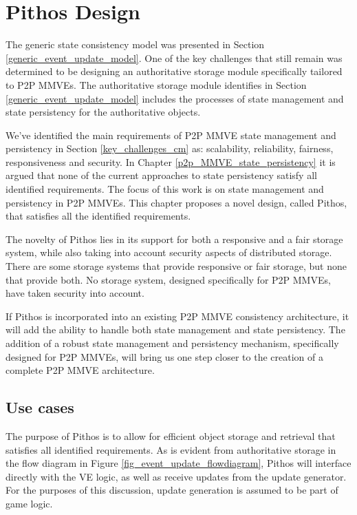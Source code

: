 \chapter{Pithos Design}
\label{chp:DESIGN}

The generic state consistency model was presented in Section \ref{generic_event_update_model}. One of the key challenges that still remain was determined to be designing an authoritative storage module specifically tailored to P2P MMVEs. The authoritative storage module identifies in Section \ref{generic_event_update_model} includes the processes of state management and state persistency for the authoritative objects.

We've identified the main requirements of P2P MMVE state management and persistency in Section \ref{key_challenges_cm} as: scalability, reliability, fairness, responsiveness and security. In Chapter \ref{p2p_MMVE_state_persistency} it is argued that none of the current approaches to state persistency satisfy all identified requirements. The focus of this work is on state management and persistency in P2P MMVEs. This chapter proposes a novel design, called Pithos, that satisfies all the identified requirements.

The novelty of Pithos lies in its support for both a responsive and a fair storage system, while also taking into account security aspects
of distributed storage. There are some storage systems that provide responsive or fair storage, but none that provide both. No storage system, designed specifically for P2P MMVEs, have taken security into account.

If Pithos is incorporated into an existing P2P MMVE consistency architecture, it will add the ability to handle both state management and state persistency. The addition of a robust state management and persistency mechanism, specifically designed for P2P MMVEs, will bring us one step closer to the creation of a complete P2P MMVE architecture.

\section{Use cases}
\label{use_cases_goals}

The purpose of Pithos is to allow for efficient object storage and retrieval that satisfies all identified requirements. As is evident from authoritative storage in the flow diagram in Figure \ref{fig_event_update_flowdiagram}, Pithos will interface directly with the VE logic, as well as receive updates from the update generator. For the purposes of this discussion, update generation is assumed to be part of game logic.

